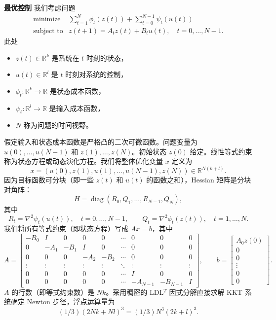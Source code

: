 \documentclass[UTF8,12pt,a4paper,fontset=fandol]{ctexart}
\begin{document}
\noindent\textbf{最优控制}\quad
我们考虑问题
\[
\begin{array}{ll}
\mbox{minimize} & \displaystyle\sum_{t=1}^N\phi_t(z(t))+\sum_{t=0}^{N-1}\psi_t(u(t))\\
\mbox{subject to} & z(t+1)=A_tz(t)+B_tu(t),\quad t=0,\ldots,N-1.
\end{array}
\]
此处

\begin{itemize}
\item $z(t)\in\mathbb{R}^k$ 是系统在 $t$ 时刻的状态，
\item $u(t)\in\mathbb{R}^l$ 是 $t$ 时刻对系统的控制，
\item $\phi_t:\mathbb{R}^k\to\mathbb{R}$ 是状态成本函数，
\item $\psi_t:\mathbb{R}^l\to\mathbb{R}$ 是输入成本函数，
\item $N$ 称为问题的时间视野。
\end{itemize}

假定输入和状态成本函数是严格凸的二次可微函数。问题变量为 $u(0),\ldots,u(N-1)$ 和 $z(1),\ldots,z(N)$。初始状态 $z(0)$ 给定。线性等式约束称为状态方程或动态演化方程。我们将整体优化变量 $x$ 定义为
\[
x=(u(0),z(1),u(1),\ldots,u(N-1),z(N))\in\mathbb{R}^{N(k+l)}.
\]
因为目标函数可分块（即一些 $z(t)$ 和 $u(t)$ 的函数之和），Hessian 矩阵是分块对角阵：
\[
H=\operatorname{diag}(R_0,Q_1,\ldots,R_{N-1},Q_N),
\]
其中
\[
R_t=\nabla^2\psi_t(u(t)),\quad t=0,\ldots,N-1,\qquad
Q_t=\nabla^2\phi_t(z(t)),\quad t=1,\ldots,N.
\]
我们将所有等式约束（即状态方程）写成 $Ax=b$，其中
\[
A=
\begin{bmatrix}
-B_0&I&0&0&0&\cdots&0&0&0\\
0&-A_1&-B_1&I&0&\cdots&0&0&0\\
0&0&0&-A_2&-B_2&\cdots&0&0&0\\
\vdots&\vdots&\vdots&\vdots&\vdots&\ddots&\vdots&\vdots&\vdots\\
0&0&0&0&0&\cdots&I&0&0\\
0&0&0&0&0&\cdots&-A_{N-1}&-B_{N-1}&I
\end{bmatrix},
\qquad
b=
\begin{bmatrix}
A_0z(0)\\
0\\
0\\
\vdots\\
0\\
0
\end{bmatrix}.
\]
$A$ 的行数（即等式约束数）是 $Nk$。采用稠密的 LDL$^T$ 因式分解直接求解 KKT 系统确定 Newton 步径，浮点运算量为
\[
(1/3)(2Nk+Nl)^3=(1/3)N^3(2k+l)^3.
\]
\end{document}
